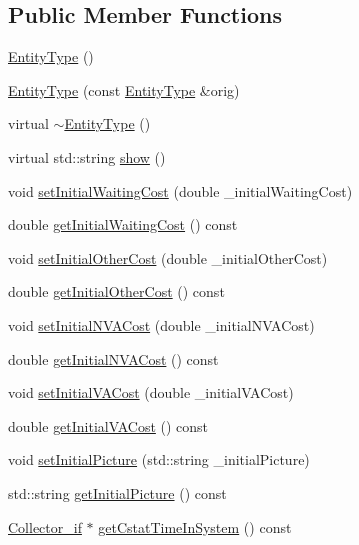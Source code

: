 \subsection*{Public Member Functions}
\begin{DoxyCompactItemize}
\item 
\hyperlink{class_entity_type_abea5cf6495bb0fb677ccf0a5e52716d3}{Entity\-Type} ()
\item 
\hyperlink{class_entity_type_a34b9576e2453ed309c75840319bbb2f8}{Entity\-Type} (const \hyperlink{class_entity_type}{Entity\-Type} \&orig)
\item 
virtual \hyperlink{class_entity_type_aee11e4242d000965f06018723bdf0946}{$\sim$\-Entity\-Type} ()
\item 
virtual std\-::string \hyperlink{class_entity_type_ab5a696912b12a9f51decded90f368dea}{show} ()
\item 
void \hyperlink{class_entity_type_affd1d2dd13149ae0989aae5cc9ea1e05}{set\-Initial\-Waiting\-Cost} (double \-\_\-initial\-Waiting\-Cost)
\item 
double \hyperlink{class_entity_type_a46dd0977b19bf167eeb12db97464b757}{get\-Initial\-Waiting\-Cost} () const 
\item 
void \hyperlink{class_entity_type_a32f126822c567a887a446a763db13d64}{set\-Initial\-Other\-Cost} (double \-\_\-initial\-Other\-Cost)
\item 
double \hyperlink{class_entity_type_ac5708811f5f6eaf7ac587fc88190b7f2}{get\-Initial\-Other\-Cost} () const 
\item 
void \hyperlink{class_entity_type_a935cac67adc2b13aa25290c3db04c847}{set\-Initial\-N\-V\-A\-Cost} (double \-\_\-initial\-N\-V\-A\-Cost)
\item 
double \hyperlink{class_entity_type_ae8b26deba82e687d5a07b863f750baf4}{get\-Initial\-N\-V\-A\-Cost} () const 
\item 
void \hyperlink{class_entity_type_aecd52de7178bb03be55798378d15d3e8}{set\-Initial\-V\-A\-Cost} (double \-\_\-initial\-V\-A\-Cost)
\item 
double \hyperlink{class_entity_type_a9833d4a85dcb5c5bd9db02e1e2e45dd9}{get\-Initial\-V\-A\-Cost} () const 
\item 
void \hyperlink{class_entity_type_ab3a19031f9b46b376bdd35aa3044c90e}{set\-Initial\-Picture} (std\-::string \-\_\-initial\-Picture)
\item 
std\-::string \hyperlink{class_entity_type_a9a464c546bc2f7fe56fbea9b761ac1f7}{get\-Initial\-Picture} () const 
\item 
\hyperlink{class_collector__if}{Collector\-\_\-if} $\ast$ \hyperlink{class_entity_type_a03977d36fb845ba7366185fa1f5fffd9}{get\-Cstat\-Time\-In\-System} () const 

\end{DoxyCompactItemize}
